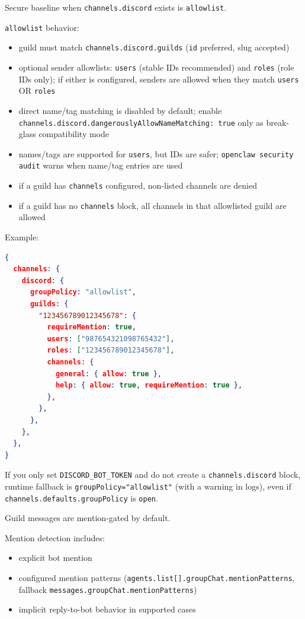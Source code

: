 Secure baseline when \texttt{channels.discord} exists is \texttt{allowlist}.

\texttt{allowlist} behavior:

\begin{itemize}
  \item guild must match \texttt{channels.discord.guilds} (\texttt{id} preferred, slug accepted)
  \item optional sender allowlists: \texttt{users} (stable IDs recommended) and \texttt{roles} (role IDs only); if either is configured, senders are allowed when they match \texttt{users} OR \texttt{roles}
  \item direct name/tag matching is disabled by default; enable \texttt{channels.discord.dangerouslyAllowNameMatching: true} only as break-glass compatibility mode
  \item names/tags are supported for \texttt{users}, but IDs are safer; \texttt{openclaw security audit} warns when name/tag entries are used
  \item if a guild has \texttt{channels} configured, non-listed channels are denied
  \item if a guild has no \texttt{channels} block, all channels in that allowlisted guild are allowed
\end{itemize}


Example:

\begin{lstlisting}[language=json]
{
  channels: {
    discord: {
      groupPolicy: "allowlist",
      guilds: {
        "123456789012345678": {
          requireMention: true,
          users: ["987654321098765432"],
          roles: ["123456789012345678"],
          channels: {
            general: { allow: true },
            help: { allow: true, requireMention: true },
          },
        },
      },
    },
  },
}
\end{lstlisting}


If you only set \texttt{DISCORD\_BOT\_TOKEN} and do not create a \texttt{channels.discord} block, runtime fallback is \texttt{groupPolicy="allowlist"} (with a warning in logs), even if \texttt{channels.defaults.groupPolicy} is \texttt{open}.


Guild messages are mention-gated by default.

Mention detection includes:

\begin{itemize}
  \item explicit bot mention
  \item configured mention patterns (\texttt{agents.list[].groupChat.mentionPatterns}, fallback \texttt{messages.groupChat.mentionPatterns})
  \item implicit reply-to-bot behavior in supported cases
\end{itemize}


